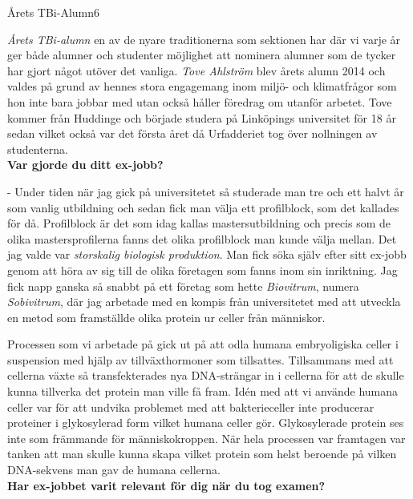 \begin{news}{2}{Årets TBi-Alumn}{}{}{6}{}


\emph{Årets TBi-alumn} en av de nyare traditionerna som sektionen har där vi varje 
år ger både alumner och studenter möjlighet att nominera alumner som de 
tycker har gjort något utöver det vanliga. \emph{Tove Ahlström} blev årets alumn 
2014 och valdes på grund av hennes stora engagemang inom miljö- och 
klimatfrågor som hon inte bara jobbar med utan också håller föredrag om 
utanför arbetet. Tove kommer från Huddinge och började studera på Linköpings 
universitet för 18 år sedan vilket också var det första året då Urfadderiet 
tog över nollningen av studenterna.
\\
 
\noindent \textbf{Var gjorde du ditt ex-jobb?}
 
 - Under tiden när jag gick på universitetet så studerade man tre och ett halvt 
 år som vanlig utbildning och sedan fick man välja ett profilblock, som det 
kallades för då. Profilblock är det som idag kallas mastersutbildning och 
precis som de olika mastersprofilerna fanns det olika profilblock man kunde 
välja mellan. Det jag valde var \emph{storskalig biologisk produktion}. Man fick 
söka själv efter sitt ex-jobb genom att höra av sig till de olika företagen 
som fanns inom sin inriktning. Jag fick napp ganska så snabbt på ett företag 
som hette \emph{Biovitrum}, numera \emph{Sobivitrum}, där jag arbetade med en kompis från 
universitetet med att utveckla en metod som framställde olika protein ur 
celler från människor.

Processen som vi arbetade på gick ut på att odla humana embryoligiska celler 
i suspension med hjälp av tillväxthormoner som tillsattes. Tillsammans med 
att cellerna växte så transfekterades nya DNA-strängar in i cellerna för att 
de skulle kunna tillverka det protein man ville få fram. Idén med att 
vi använde humana celler var för att undvika problemet med att bakterieceller 
inte producerar proteiner i glykosylerad form vilket humana celler gör. 
Glykosylerade protein ses inte som främmande för människokroppen. När hela 
processen var framtagen var tanken att man skulle kunna skapa vilket protein 
som helst beroende på vilken DNA-sekvens man gav de humana cellerna.
\\
 
\noindent \textbf{Har ex-jobbet varit relevant för dig när du tog examen?}


\end{news}
